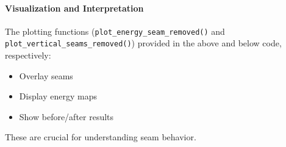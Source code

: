 \documentclass[11pt]{article}
\providecommand{\tightlist}{%
      \setlength{\itemsep}{0pt}\setlength{\parskip}{0pt}}
\begin{document}
    \hypertarget{visualization-and-interpretation}{%
\paragraph{\texorpdfstring{\textbf{Visualization and
Interpretation}}{Visualization and Interpretation}}\label{visualization-and-interpretation}}

The plotting functions (\texttt{plot\_energy\_seam\_removed()} and
\texttt{plot\_vertical\_seams\_removed()}) provided in the above and
below code, respectively:

\begin{itemize}
\tightlist
\item
  Overlay seams
\item
  Display energy maps
\item
  Show before/after results
\end{itemize}

These are crucial for understanding seam behavior.
\end{document}
